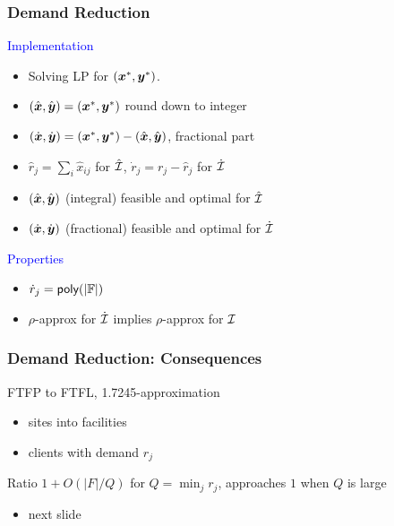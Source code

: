 \documentclass[hyperref,dvipsnames,svgnames,compress]{beamer}
\begin{document}
\begin{frame}
  \frametitle{Demand Reduction}

  \large{\textcolor{blue}{Implementation}}

  \begin{itemize}
  \item Solving LP for $(\boldsymbol{x}^\ast, \boldsymbol{y}^\ast)$.
  \item $(\hat{\boldsymbol{x}}, \hat{\boldsymbol{y}}) = (\boldsymbol{x}^\ast, \boldsymbol{y}^\ast)$ round down to integer
  \item $(\dot{\boldsymbol{x}}, \dot{\boldsymbol{y}}) = (\boldsymbol{x}^\ast, \boldsymbol{y}^\ast) - (\hat{\boldsymbol{x}}, \hat{\boldsymbol{y}})$, fractional part
  \item $\hat r_j = \sum_{i}\hat x_{ij}$ for $\hat{\mathcal{I}}$, $\dot r_j = r_j - \hat r_j$ for $\dot{\mathcal{I}}$
  \item $(\hat{\boldsymbol{x}}, \hat{\boldsymbol{y}})$ (integral) feasible and optimal for $\hat{\mathcal{I}}$
  \item $(\dot{\boldsymbol{x}}, \dot{\boldsymbol{y}})$ (fractional) feasible and optimal for $\dot{\mathcal{I}}$
  \end{itemize}
  
  \large{\textcolor{blue}{Properties}}

  \begin{itemize}
  \item ${\dot r}_j = {\mbox{\sf poly}}(|\mathbb{F}|)$
  \item $\rho$-approx for $\dot {\mathcal{I}}$ implies $\rho$-approx for $\mathcal{I}$
  \end{itemize}
\end{frame}

\begin{frame}
  \frametitle{Demand Reduction: Consequences}
  \begin{block}{}
    FTFP to FTFL, 1.7245-approximation    
  \end{block}
  \begin{itemize}
  \item sites into facilities
  \item clients with demand $r_j$
  \end{itemize}

  \begin{block}{}
    Ratio $1 + O(|F| / Q)$ for $Q = \min_j r_j$,
    approaches $1$ when $Q$ is large
  \end{block}
  \begin{itemize}
  \item next slide
  \end{itemize}
\end{frame}
\end{document}
